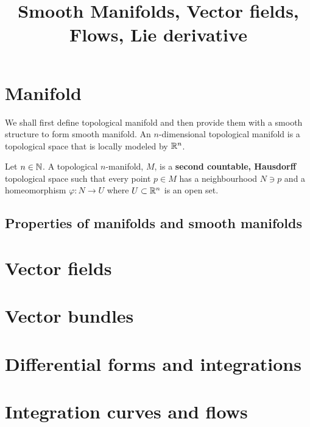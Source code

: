 \documentclass[]{article}
\title{Smooth Manifolds, Vector fields, Flows, Lie derivative}
\author{}
\begin{document}
\maketitle

\section{Manifold}
We shall first define topological manifold and then provide them with a smooth structure to form smooth manifold. An $n$-dimensional topological manifold is a topological space that is locally modeled by ${\mathbb R}^n$.  \\

\begin{fdefinition} Let $n \in {\ensuremath {\mathbb N}}$. A topological $n$-manifold, $M$, is a \textbf{second countable, Hausdorff} topological space such that every point $p \in M$ has a neighbourhood $N \ni p$ and a homeomorphism $\varphi: N \to U$ where $U \subset {\ensuremath {\mathbb R}}^n$ is an open set. 
\end{fdefinition}

\begin{fdefinition}
\end{fdefinition}

\begin{fdefinition}
\end{fdefinition}

\begin{fdefinition}
\end{fdefinition}

\subsection{Properties of manifolds and smooth manifolds}




\section{Vector fields}


\section{Vector bundles}

\section{Differential forms and integrations}

\section{Integration curves and flows}
\end{document}
